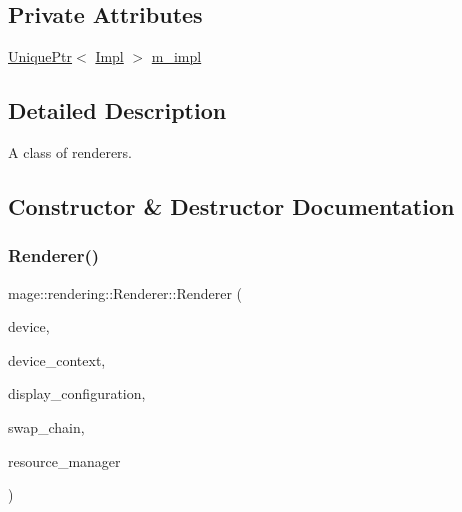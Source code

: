 \subsection*{Private Attributes}
\begin{DoxyCompactItemize}
\item 
\hyperlink{namespacemage_a3316d7143a973e37adf1110f2e80ca31}{Unique\+Ptr}$<$ \hyperlink{classmage_1_1rendering_1_1_renderer_1_1_impl}{Impl} $>$ \hyperlink{classmage_1_1rendering_1_1_renderer_aee44d4c9014216d84030ecfc6e64b1e4}{m\+\_\+impl}
\end{DoxyCompactItemize}


\subsection{Detailed Description}
A class of renderers. 

\subsection{Constructor \& Destructor Documentation}
\hypertarget{classmage_1_1rendering_1_1_renderer_a8e517a323bb67bf8b347ff46204ccec9}{}\label{classmage_1_1rendering_1_1_renderer_a8e517a323bb67bf8b347ff46204ccec9} 
\subsubsection{\texorpdfstring{Renderer()}{Renderer()}\hspace{0.1cm}{\footnotesize\ttfamily [1/3]}}
{\footnotesize\ttfamily mage\+::rendering\+::\+Renderer\+::\+Renderer (\begin{DoxyParamCaption}\item[{I\+D3\+D11\+Device \&}]{device,  }\item[{I\+D3\+D11\+Device\+Context \&}]{device\+\_\+context,  }\item[{\hyperlink{classmage_1_1rendering_1_1_display_configuration}{Display\+Configuration} \&}]{display\+\_\+configuration,  }\item[{\hyperlink{classmage_1_1rendering_1_1_swap_chain}{Swap\+Chain} \&}]{swap\+\_\+chain,  }\item[{\hyperlink{classmage_1_1rendering_1_1_resource_manager}{Resource\+Manager} \&}]{resource\+\_\+manager }\end{DoxyParamCaption})\hspace{0.3cm}{\ttfamily [explicit]}}


